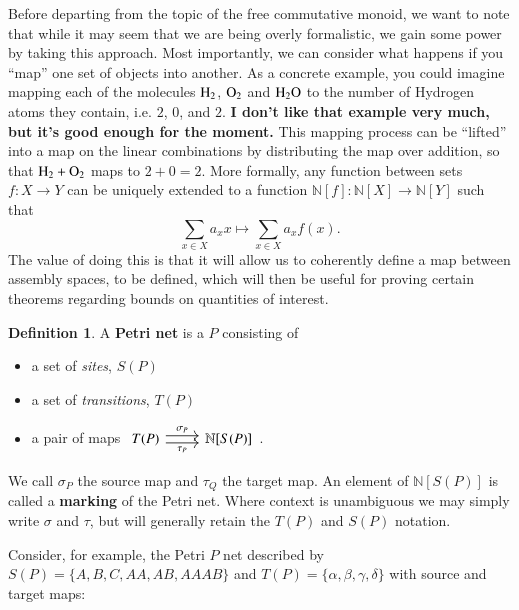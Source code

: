 \documentclass[aps,prd,onecolumn,nofootinbib,letterpaper,preprintnumbers,superscriptaddress,eqsecnum]{revtex4}
\theoremstyle{definition}
\newtheorem{definition}{Definition}
\newcommand{\N}{\mathbb{N}}
\begin{document}
Before departing from the topic of the free commutative monoid, we want to note that while it may seem that we are being overly formalistic, we gain some power by taking this approach.
Most importantly, we can consider what happens if you ``map'' one set of objects into another. 
As a concrete example, you could imagine mapping each of the molecules $\ce{H_2}$, $\ce{O_2}$ and $\ce{H_2O}$ to the number of Hydrogen atoms they contain, i.e. $2$, $0$, and $2$.
\textbf{I don't like that example very much, but it's good enough for the moment.}
This mapping process can be ``lifted'' into a map on the linear combinations by distributing the map over addition, so that $\ce{H_2} + \ce{O_2}$ maps to $2 + 0 = 2$. More formally, any function between sets $f : X \rightarrow Y$ can be uniquely extended to a function $\N[f] : \N[X] \rightarrow \N[Y]$ such that
\begin{equation*}
    \sum_{x \in X} a_x x \mapsto \sum_{x \in X} a_x f(x).
\end{equation*}
The value of doing this is that it will allow us to coherently define a map between assembly spaces, to be defined, which will then be useful for proving certain theorems regarding bounds on quantities of interest.

\begin{definition}\label{def:petri}
    A \textbf{Petri net} is a $P$ consisting of
    \begin{itemize}
        \item a set of \textit{sites}, $S(P)$
        \item a set of \textit{transitions}, $T(P)$
        \item a pair of maps $\begin{tikzcd}
                T(P)
                \arrow[r, shift left = 1, "\sigma_P"]
                \arrow[r, shift right = 1, "\tau_P", swap]
                &
                \N[S(P)]
        \end{tikzcd}$.
    \end{itemize}
    We call $\sigma_P$ the source map and $\tau_Q$ the target map.
    An element of $\N[S(P)]$ is called a \textbf{marking} of the Petri net.
    Where context is unambiguous we may simply write $\sigma$ and $\tau$, but will generally retain the $T(P)$ and $S(P)$ notation.
\end{definition}

Consider, for example, the Petri $P$ net described by $S(P) = \{ A, B, C, AA, AB, AAAB \}$ and $T(P) = \{ \alpha, \beta, \gamma, \delta \}$ with source and target maps:
\end{document}
